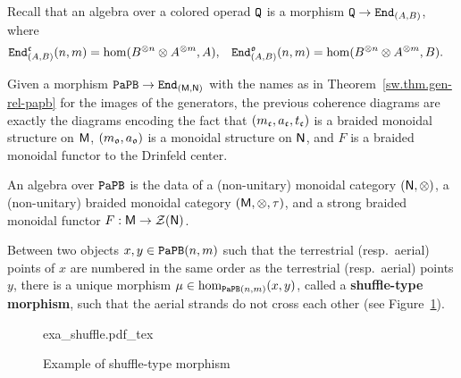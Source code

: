Recall that an algebra over a colored operad $\mathtt{Q}$ is a morphism $\mathtt{Q} \to \mathtt{End}_{(A,B)}$, where
\begin{align*}
  \mathtt{End}_{(A,B)}^{\mathfrak{c}}(n,m)
  & = \hom(B^{\otimes n} \otimes A^{\otimes m}, A),
  & \mathtt{End}_{(A,B)}^{\mathfrak{o}}(n,m)
  & = \hom(B^{\otimes n} \otimes A^{\otimes m}, B).
\end{align*}

Given a morphism $\mathtt{PaPB} \to \mathtt{End}_{(\mathsf{M},\mathsf{N})}$ with the names as in Theorem~\ref{sw.thm.gen-rel-papb} for the images of the generators, the previous coherence diagrams are exactly the diagrams encoding the fact that $(m_{\mathfrak{c}}, a_{\mathfrak{c}}, t_{\mathfrak{c}})$ is a braided monoidal structure on $\mathsf{M}$, $(m_{\mathfrak{o}}, a_{\mathfrak{o}})$ is a monoidal structure on $\mathsf{N}$, and $F$ is a braided monoidal functor to the Drinfeld center.

\begin{corollary}\label{sw.cor.alg-papb}
  An algebra over $\mathtt{PaPB}$ is the data of a (non-unitary) monoidal category $(\mathsf{N}, \otimes)$, a (non-unitary) braided monoidal category $(\mathsf{M}, \otimes, \tau)$, and a strong braided monoidal functor $F : \mathsf{M} \to \mathcal{Z}(\mathsf{N})$.
\end{corollary}

\begin{definition} \label{sw.def.shuffle-type}
  Between two objects $x,y \in \mathtt{PaPB}(n,m)$ such that the terrestrial (resp.\ aerial) points of $x$ are numbered in the same order as the terrestrial (resp.\ aerial) points $y$, there is a unique morphism $\mu \in \hom_{\mathtt{PaPB}(n,m)}(x,y)$, called a \textbf{shuffle-type morphism}, such that the aerial strands do not cross each other (see Figure~\ref{sw.fig.exa-shuffle-type}).
\end{definition}

\begin{figure}[htbp]
  \centering
  \def\svgwidth{0.6\textwidth} {exa_shuffle.pdf_tex}
  \caption{Example of shuffle-type morphism}
  \label{sw.fig.exa-shuffle-type}
\end{figure}

